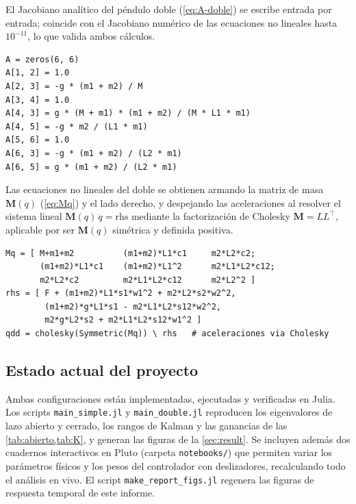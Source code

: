 \documentclass[11pt,letterpaper]{article}
\theoremstyle{definition}
\theoremstyle{plain}
\theoremstyle{remark}
\begin{document}
El Jacobiano analítico del péndulo doble (\cref{eq:A-doble}) se escribe entrada
por entrada; coincide con el Jacobiano numérico de las ecuaciones no lineales
hasta $10^{-11}$, lo que valida ambos cálculos.

\begin{lstlisting}
A = zeros(6, 6)
A[1, 2] = 1.0
A[2, 3] = -g * (m1 + m2) / M
A[3, 4] = 1.0
A[4, 3] = g * (M + m1) * (m1 + m2) / (M * L1 * m1)
A[4, 5] = -g * m2 / (L1 * m1)
A[5, 6] = 1.0
A[6, 3] = -g * (m1 + m2) / (L2 * m1)
A[6, 5] = g * (m1 + m2) / (L2 * m1)
\end{lstlisting}

Las ecuaciones no lineales del doble se obtienen armando la matriz de masa
$\mathbf{M}(q)$ (\cref{eq:Mq}) y el lado derecho, y despejando las aceleraciones
al resolver el sistema lineal $\mathbf{M}(q)\,\ddot q=\text{rhs}$ mediante la
factorizaci\'on de Cholesky $\mathbf{M}=LL^\top$, aplicable por ser
$\mathbf{M}(q)$ sim\'etrica y definida positiva.

\begin{lstlisting}
Mq = [ M+m1+m2          (m1+m2)*L1*c1     m2*L2*c2;
       (m1+m2)*L1*c1    (m1+m2)*L1^2      m2*L1*L2*c12;
       m2*L2*c2         m2*L1*L2*c12      m2*L2^2 ]
rhs = [ F + (m1+m2)*L1*s1*w1^2 + m2*L2*s2*w2^2,
        (m1+m2)*g*L1*s1 - m2*L1*L2*s12*w2^2,
        m2*g*L2*s2 + m2*L1*L2*s12*w1^2 ]
qdd = cholesky(Symmetric(Mq)) \ rhs   # aceleraciones via Cholesky
\end{lstlisting}

\subsection*{Estado actual del proyecto}

Ambas configuraciones están implementadas, ejecutadas y verificadas en Julia.
Los scripts \texttt{main\_simple.jl} y \texttt{main\_double.jl} reproducen los
eigenvalores de lazo abierto y cerrado, los rangos de Kalman y las ganancias de
las \cref{tab:abierto,tab:K}, y generan las figuras de la \cref{sec:result}. Se
incluyen además dos cuadernos interactivos en Pluto (carpeta
\texttt{notebooks/}) que permiten variar los parámetros físicos y los pesos del
controlador con deslizadores, recalculando todo el análisis en vivo. El script
\texttt{make\_report\_figs.jl} regenera las figuras de respuesta temporal de
este informe.
\end{document}
